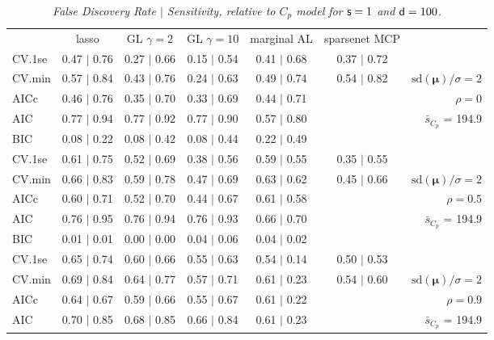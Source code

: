 \documentclass[12pt]{article}
\newcommand{\mr}[1]{\mathrm{#1}}
\newcommand{\bm}[1]{\mathbf{#1}}
\begin{document}
\begin{table}[p]\vspace{-.5cm}
\caption[l]{\label{sens}\it False Discovery Rate $\mid$ Sensitivity, relative to $C_p$ model  for ${\sf s}=1$ and ${\sf d}=100$.}
\vspace{-.5cm}
\small{}
\begin{center}
\begin{tabular}{l*{5}{c}|r}
 & lasso & GL $\gamma=2$ & GL $\gamma=10$ & marginal AL & sparsenet MCP  & \\
 \cline{1-7}
CV.1se & 0.47 $\mid$ 0.76 & 0.27 $\mid$ 0.66 & 0.15 $\mid$ 0.54 & 0.41 $\mid$ 0.68 & 0.37 $\mid$ 0.72 &\\
CV.min & 0.57 $\mid$ 0.84 & 0.43 $\mid$ 0.76 & 0.24 $\mid$ 0.63 & 0.49 $\mid$ 0.74 & 0.54 $\mid$ 0.82 &  $\mr{sd}(\bm{\mu})/\sigma=2$ \\
AICc & 0.46 $\mid$ 0.76 & 0.35 $\mid$ 0.70 & 0.33 $\mid$ 0.69 & 0.44 $\mid$ 0.71 & & $\rho=0$ \\
AIC & 0.77 $\mid$ 0.94 & 0.77 $\mid$ 0.92 & 0.77 $\mid$ 0.90 & 0.57 $\mid$ 0.80 & & \multirow{2}{*}{$\bar{s}_{C_p}$ = 194.9} \\
BIC & 0.08 $\mid$ 0.22 & 0.08 $\mid$ 0.42 & 0.08 $\mid$ 0.44 & 0.22 $\mid$ 0.49 & & \\
 \hline 
CV.1se & 0.61 $\mid$ 0.75 & 0.52 $\mid$ 0.69 & 0.38 $\mid$ 0.56 & 0.59 $\mid$ 0.55 & 0.35 $\mid$ 0.55 &\\
CV.min & 0.66 $\mid$ 0.83 & 0.59 $\mid$ 0.78 & 0.47 $\mid$ 0.69 & 0.63 $\mid$ 0.62 & 0.45 $\mid$ 0.66 &  $\mr{sd}(\bm{\mu})/\sigma=2$ \\
AICc & 0.60 $\mid$ 0.71 & 0.52 $\mid$ 0.70 & 0.44 $\mid$ 0.67 & 0.61 $\mid$ 0.58 & & $\rho=0.5$ \\
AIC & 0.76 $\mid$ 0.95 & 0.76 $\mid$ 0.94 & 0.76 $\mid$ 0.93 & 0.66 $\mid$ 0.70 & & \multirow{2}{*}{$\bar{s}_{C_p}$ = 194.9} \\
BIC & 0.01 $\mid$ 0.01 & 0.00 $\mid$ 0.00 & 0.04 $\mid$ 0.06 & 0.04 $\mid$ 0.02 & & \\
 \hline 
CV.1se & 0.65 $\mid$ 0.74 & 0.60 $\mid$ 0.66 & 0.55 $\mid$ 0.63 & 0.54 $\mid$ 0.14 & 0.50 $\mid$ 0.53 &\\
CV.min & 0.69 $\mid$ 0.84 & 0.64 $\mid$ 0.77 & 0.57 $\mid$ 0.71 & 0.61 $\mid$ 0.23 & 0.54 $\mid$ 0.60 &  $\mr{sd}(\bm{\mu})/\sigma=2$ \\
AICc & 0.64 $\mid$ 0.67 & 0.59 $\mid$ 0.66 & 0.55 $\mid$ 0.67 & 0.61 $\mid$ 0.22 & & $\rho=0.9$ \\
AIC & 0.70 $\mid$ 0.85 & 0.68 $\mid$ 0.85 & 0.66 $\mid$ 0.84 & 0.61 $\mid$ 0.23 & & \multirow{2}{*}{$\bar{s}_{C_p}$ = 194.9} \\

\end{tabular}
\end{center}
\end{table}
\end{document}
